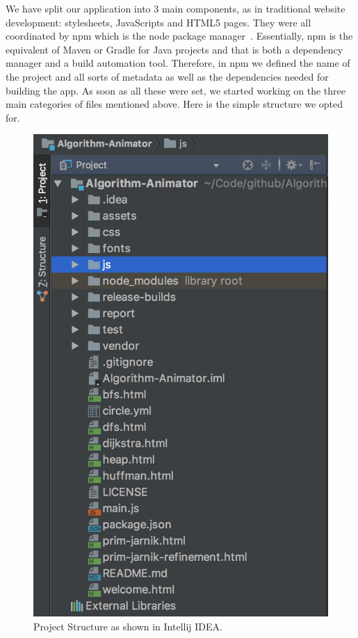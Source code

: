 \documentclass{l4proj}
\begin{document}
We have split our application into 3 main components, as in traditional website development: stylesheets, JavaScripts
and HTML5 pages. They were all coordinated by npm which is the node package manager~\cite{npm}. Essentially,
npm is the equivalent of Maven or Gradle for Java projects and that is both a dependency manager and a build automation
tool. Therefore, in npm we defined the name of the project and all sorts of metadata as well as the dependencies needed
for building the app. As soon as all these were set, we started working on the three main categories of files mentioned
above. Here is the simple structure we opted for.

\begin{figure}[!ht]
    \centering
    \includegraphics[scale=0.4]{project-structure}
    \caption{Project Structure as shown in Intellij IDEA.}
    \label{fig:project-structure}
\end{figure}
\end{document}
